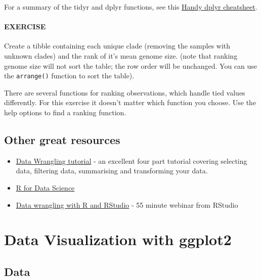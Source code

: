 \documentclass[]{book}
\providecommand{\tightlist}{%
  \setlength{\itemsep}{0pt}\setlength{\parskip}{0pt}}
\begin{document}
For a summary of the tidyr and dplyr functions, see this \href{http://www.rstudio.com/wp-content/uploads/2015/02/data-wrangling-cheatsheet.pdf}{Handy dplyr cheatsheet}.

\hypertarget{exercise-20}{%
\subsubsection*{EXERCISE}\label{exercise-20}}

Create a tibble containing each unique clade (removing the samples with unknown clades) and the rank of it's mean genome size. (note that ranking genome size will not sort the table; the row order will be unchanged. You can use the \texttt{arrange()} function to sort the table).

There are several functions for ranking observations, which handle tied values differently. For this exercise it doesn't matter which function you choose. Use the help options to find a ranking function.

\hypertarget{other-great-resources}{%
\section{Other great resources}\label{other-great-resources}}

\begin{itemize}
\tightlist
\item
  \href{https://suzan.rbind.io/categories/tutorial/}{Data Wrangling tutorial} - an excellent four part tutorial covering selecting data, filtering data, summarising and transforming your data.
\item
  \href{http://r4ds.had.co.nz/}{R for Data Science}
\item
  \href{https://www.rstudio.com/resources/webinars/data-wrangling-with-r-and-rstudio/}{Data wrangling with R and RStudio} - 55 minute webinar from RStudio
\end{itemize}

\hypertarget{data-visualization-with-ggplot2}{%
\chapter{Data Visualization with ggplot2}\label{data-visualization-with-ggplot2}}

\hypertarget{data}{%
\section{Data}\label{data}}
\end{document}
